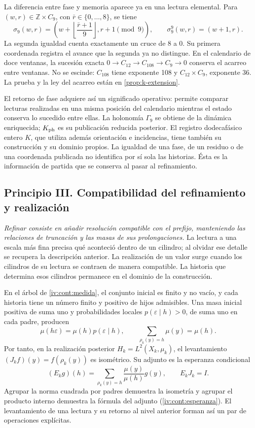 La diferencia entre fase y memoria aparece ya en una lectura elemental.
Para \((w,r)\in\mathbb Z\times C_9\), con
\(\bar r\in\{0,\ldots,8\}\), se tiene
\[
 \sigma_9(w,r)=
 \left(w+\left\lfloor\frac{\bar r+1}{9}\right\rfloor,
       r+1\pmod9\right),\qquad
 \sigma_9^9(w,r)=(w+1,r).
\]
La segunda igualdad cuenta exactamente un cruce de 8 a 0. Su primera
coordenada registra el avance que la segunda ya no distingue. En el
calendario de doce ventanas, la sucesión exacta
\(0\to C_{12}\to C_{108}\to C_9\to0\) conserva el acarreo entre
ventanas. No se escinde: \(C_{108}\) tiene exponente 108 y
\(C_{12}\times C_9\), exponente 36. La prueba y la ley del acarreo están
en \cref{prop:k-extension}.

El retorno de fase adquiere así un significado operativo: permite
comparar lecturas realizadas en una misma posición del calendario mientras
el estado conserva lo sucedido entre ellas. La holonomía \(\Gamma_9\)
se obtiene de la dinámica enriquecida; \(K_{\rm ph}\) es su publicación
reducida posterior. El registro dodecafásico entero \(K\), que utiliza
además orientación e incidencias, tiene también su construcción y su dominio
propios. La igualdad de una fase, de un residuo o de una coordenada publicada
no identifica por sí sola las historias. Ésta es la información de partida
que se conserva al pasar al refinamiento.

\subsection*{Principio III. Compatibilidad del refinamiento y realización}
\hypertarget{prinh:refinamiento}{}

\emph{Refinar consiste en añadir resolución compatible con el prefijo,
manteniendo las relaciones de truncación y las masas de sus prolongaciones.}
La lectura a una escala más fina precisa qué aconteció dentro de un
cilindro; al olvidar ese detalle se recupera la descripción anterior.
La realización de un valor surge cuando los cilindros de su lectura se
contraen de manera compatible. La historia que determina esos cilindros
permanece en el dominio de la construcción.

En el árbol de \cref{iv:cont:medida}, el conjunto inicial es finito y no
vacío, y cada historia tiene un número finito y positivo de hijos
admisibles. Una masa inicial positiva de suma uno y probabilidades locales
\(p(\varepsilon\mid h)>0\), de suma uno en cada padre, producen
\[
 \mu(h\varepsilon)=\mu(h)p(\varepsilon\mid h),\qquad
 \sum_{\rho_k(y)=h}\mu(y)=\mu(h).
\]
Por tanto, en la realización posterior
\(H_k=L^2(X_k,\mu_k)\), el levantamiento
\((J_kf)(y)=f(\rho_k(y))\) es isométrico. Su adjunto es la esperanza
condicional
\[
 (E_kg)(h)=\sum_{\rho_k(y)=h}
                  \frac{\mu(y)}{\mu(h)}g(y),
 \qquad E_kJ_k=I.
\]
Agrupar la norma cuadrada por padres demuestra la isometría y agrupar el
producto interno demuestra la fórmula del adjunto
(\cref{iv:cont:esperanza}). El levantamiento de una lectura y su retorno
al nivel anterior forman así un par de operaciones explícitas.

